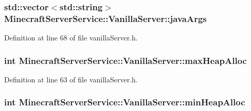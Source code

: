 \subsubsection[{\texorpdfstring{java\+Args}{javaArgs}}]{\setlength{\rightskip}{0pt plus 5cm}std\+::vector$<$std\+::string$>$ Minecraft\+Server\+Service\+::\+Vanilla\+Server\+::java\+Args\hspace{0.3cm}{\ttfamily [protected]}}\hypertarget{class_minecraft_server_service_1_1_vanilla_server_a5505cb132333925275cafd3d0ef96fd8}{}\label{class_minecraft_server_service_1_1_vanilla_server_a5505cb132333925275cafd3d0ef96fd8}


Definition at line 68 of file vanilla\+Server.\+h.

\subsubsection[{\texorpdfstring{max\+Heap\+Alloc}{maxHeapAlloc}}]{\setlength{\rightskip}{0pt plus 5cm}int Minecraft\+Server\+Service\+::\+Vanilla\+Server\+::max\+Heap\+Alloc\hspace{0.3cm}{\ttfamily [protected]}}\hypertarget{class_minecraft_server_service_1_1_vanilla_server_ac065cff3dfe1b639259feee3a9f6767c}{}\label{class_minecraft_server_service_1_1_vanilla_server_ac065cff3dfe1b639259feee3a9f6767c}


Definition at line 63 of file vanilla\+Server.\+h.

\subsubsection[{\texorpdfstring{min\+Heap\+Alloc}{minHeapAlloc}}]{\setlength{\rightskip}{0pt plus 5cm}int Minecraft\+Server\+Service\+::\+Vanilla\+Server\+::min\+Heap\+Alloc\hspace{0.3cm}{\ttfamily [protected]}}\hypertarget{class_minecraft_server_service_1_1_vanilla_server_a5e1519f9ec36c337ea713b4502e37f3f}{}\label{class_minecraft_server_service_1_1_vanilla_server_a5e1519f9ec36c337ea713b4502e37f3f}


